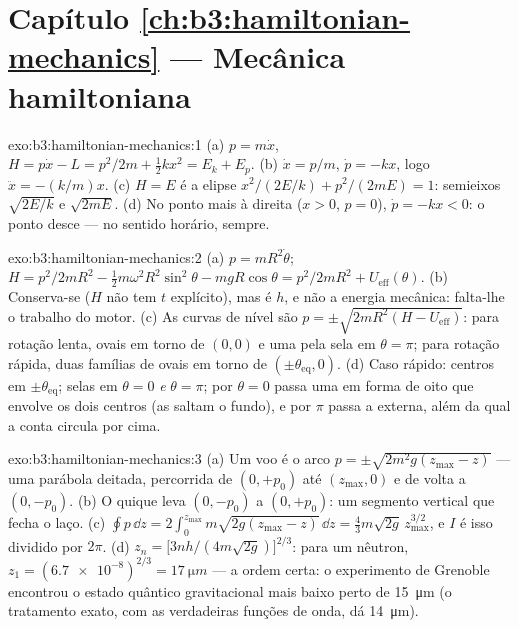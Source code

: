 \section*{Capítulo \ref{ch:b3:hamiltonian-mechanics} --- Mecânica hamiltoniana}

\begin{solution}{exo:b3:hamiltonian-mechanics:1}
(a) $p = m\dot x$, $H = p\dot x - L = p^2/2m + \tfrac12 kx^2 = E_k +
E_p$. (b) $\dot x = p/m$, $\dot p = -kx$, logo $\ddot x = -(k/m)x$.
(c) $H = E$ é a elipse $x^2/(2E/k) + p^2/(2mE) = 1$: semieixos
$\sqrt{2E/k}$ e $\sqrt{2mE}$. (d) No ponto mais à direita ($x > 0$,
$p = 0$), $\dot p = -kx < 0$: o ponto desce --- no sentido horário,
sempre.
\end{solution}

\begin{solution}{exo:b3:hamiltonian-mechanics:2}
(a) $p = mR^2\dot\theta$; $H = p^2/2mR^2 - \tfrac12 m\omega^2R^2
\sin^2\theta - mgR\cos\theta = p^2/2mR^2 + U_{\text{eff}}(\theta)$.
(b) Conserva-se ($H$ não tem $t$ explícito), mas é $h$, e não a
energia mecânica: falta-lhe o trabalho do motor. (c) As curvas de
nível são $p = \pm\sqrt{2mR^2(H - U_{\text{eff}})}$: para rotação
lenta, ovais em torno de $(0, 0)$ e uma  pela sela em
$\theta = \pi$; para rotação rápida, duas famílias de ovais em torno de
$(\pm\theta_{\text{eq}}, 0)$. (d) Caso rápido: centros em
$\pm\theta_{\text{eq}}$; selas em $\theta = 0$ \emph{e} $\theta =
\pi$; por $\theta = 0$ passa uma  em forma de oito
que envolve os dois centros (as  saltam o fundo), e
por $\pi$ passa a  externa, além da qual a conta circula por
cima.
\end{solution}

\begin{solution}{exo:b3:hamiltonian-mechanics:3}
(a) Um voo é o arco $p = \pm\sqrt{2m^2g(z_{\max} - z)}$ --- uma
parábola deitada, percorrida de $(0, +p_0)$ até
$(z_{\max}, 0)$ e de volta a $(0, -p_0)$. (b) O quique leva
$(0, -p_0)$ a $(0, +p_0)$: um segmento vertical que fecha o laço. (c)
$\oint p\,\dd z = 2\int_0^{z_{\max}}m\sqrt{2g(z_{\max} - z)}\,\dd z =
\tfrac43 m\sqrt{2g}\,z_{\max}^{3/2}$, e $I$ é isso dividido por $2\pi$. (d)
$z_n = \big[3nh/(4m\sqrt{2g})\big]^{2/3}$: para um nêutron, $z_1 =
(\num{6.7e-8})^{2/3} = \qty{17}{\micro m}$ --- a ordem certa: o
experimento de Grenoble encontrou o estado quântico gravitacional mais
baixo perto de \qty{15}{\micro m} (o tratamento exato, com as
verdadeiras funções de onda, dá \qty{14}{\micro m}).
\end{solution}

